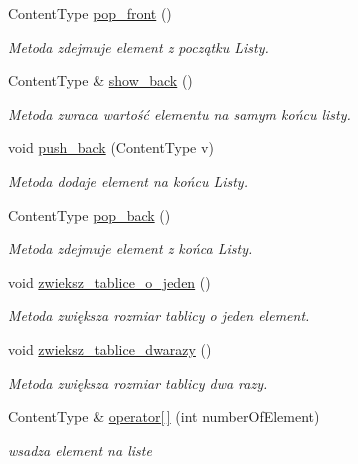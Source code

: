 \begin{DoxyCompactItemize}
Content\-Type \hyperlink{class_table_list_a273ca0eca7f99a3c2808d4b188a0a950}{pop\-\_\-front} ()
\begin{DoxyCompactList}\small\item\em Metoda zdejmuje element z początku Listy. \end{DoxyCompactList}\item 
Content\-Type \& \hyperlink{class_table_list_a715d5eb057d9801470b9fcc09f973828}{show\-\_\-back} ()
\begin{DoxyCompactList}\small\item\em Metoda zwraca wartość elementu na samym końcu listy. \end{DoxyCompactList}\item 
void \hyperlink{class_table_list_af314e74d4a62e1464d15602e513c9f2d}{push\-\_\-back} (Content\-Type v)
\begin{DoxyCompactList}\small\item\em Metoda dodaje element na końcu Listy. \end{DoxyCompactList}\item 
Content\-Type \hyperlink{class_table_list_a1988aea382b8860e16dbc6b242d87619}{pop\-\_\-back} ()
\begin{DoxyCompactList}\small\item\em Metoda zdejmuje element z końca Listy. \end{DoxyCompactList}\item 
void \hyperlink{class_table_list_a640180ba85532879f1648bc6802bdee7}{zwieksz\-\_\-tablice\-\_\-o\-\_\-jeden} ()
\begin{DoxyCompactList}\small\item\em Metoda zwiększa rozmiar tablicy o jeden element. \end{DoxyCompactList}\item 
void \hyperlink{class_table_list_a71739acdca32cb7333d0075e36c89fad}{zwieksz\-\_\-tablice\-\_\-dwarazy} ()
\begin{DoxyCompactList}\small\item\em Metoda zwiększa rozmiar tablicy dwa razy. \end{DoxyCompactList}\item 
Content\-Type \& \hyperlink{class_table_list_a17643c9355b4e209baf8ed2fe7fff88b}{operator\mbox{[}$\,$\mbox{]}} (int number\-Of\-Element)
\begin{DoxyCompactList}\small\item\em wsadza element na liste \end{DoxyCompactList}\item 

\end{DoxyCompactItemize}
